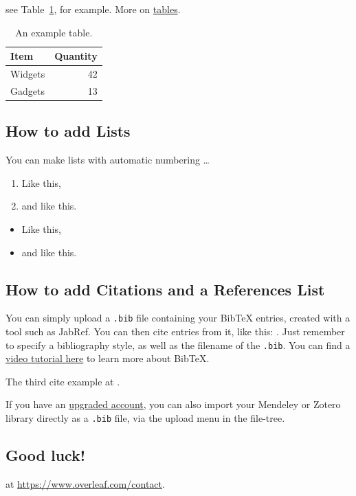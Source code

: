 \documentclass{article}
\begin{document}
see Table~\ref{tab:widgets}, for example. More on \href{https://www.overleaf.com/learn/latex/tables}{tables}. 

\begin{table}
\centering
\begin{tabular}{l|r}
Item & Quantity \\\hline
Widgets & 42 \\
Gadgets & 13
\end{tabular}
\caption{\label{tab:widgets}An example table.}
\end{table}


\subsection{How to add Lists}

You can make lists with automatic numbering \dots

\begin{enumerate}
\item Like this,
\item and like this.
\end{enumerate}


\begin{itemize}
\item Like this,
\item and like this.
\end{itemize}

\subsection{How to add Citations and a References List}

You can simply upload a \verb|.bib| file containing your BibTeX entries, created with a tool such as JabRef. You can then cite entries from it, like this: \cite{greenwade93}. Just remember to specify a bibliography style, as well as the filename of the \verb|.bib|. You can find a \href{https://www.overleaf.com/help/97-how-to-include-a-bibliography-using-bibtex}{video tutorial here} to learn more about BibTeX. 

The third cite example at \cite{AgenciaGobiernoElectronico2024}.

If you have an \href{https://www.overleaf.com/user/subscription/plans}{upgraded account}, you can also import your Mendeley or Zotero library directly as a \verb|.bib| file, via the upload menu in the file-tree.

\subsection{Good luck!}

 at \url{https://www.overleaf.com/contact}.



\end{document}

